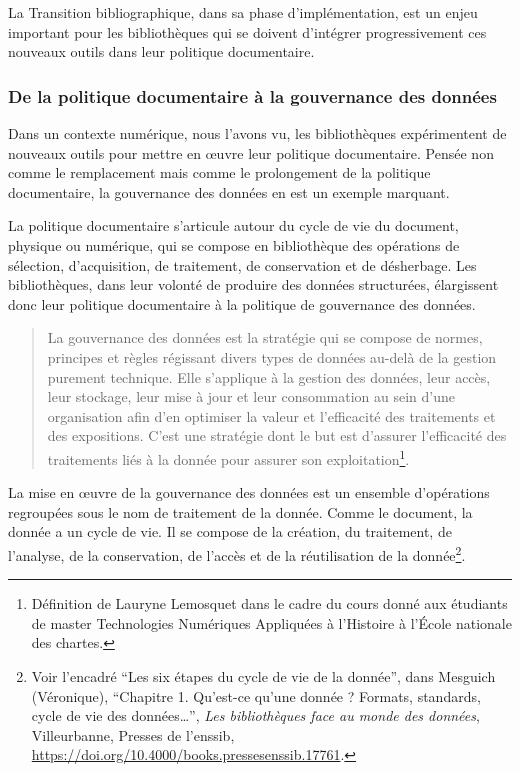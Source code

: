 La Transition bibliographique, dans sa phase d’implémentation, est un enjeu important pour les bibliothèques qui se doivent d’intégrer progressivement ces nouveaux outils dans leur politique documentaire.

\subsubsection*{De la politique documentaire à la gouvernance des données}

Dans un contexte numérique, nous l'avons vu, les bibliothèques expérimentent de nouveaux outils pour mettre en œuvre leur politique documentaire. Pensée non comme le remplacement mais comme le prolongement de la politique documentaire, la gouvernance des données en est un exemple marquant.

La politique documentaire s'articule autour du cycle de vie du document, physique ou numérique, qui se compose en bibliothèque des opérations de sélection, d'acquisition, de traitement, de conservation et de désherbage. Les bibliothèques, dans leur volonté de produire des données structurées, élargissent donc leur politique documentaire à la politique de gouvernance des données.

\begin{quotation}
	La gouvernance des données est la stratégie qui se compose de normes, principes et règles régissant divers types de données au-delà de la gestion purement technique. Elle s'applique à la gestion des données, leur accès, leur stockage, leur mise à jour et leur consommation au sein d’une organisation afin d’en optimiser la valeur et l’efficacité des traitements et des expositions. C'est une stratégie dont le but est d’assurer l’efficacité des traitements liés à la donnée pour assurer son exploitation\footnote{Définition de Lauryne Lemosquet dans le cadre du cours donné aux étudiants de master Technologies Numériques Appliquées à l'Histoire à l'École nationale des chartes.}.
\end{quotation}

La mise en œuvre de la gouvernance des données est un ensemble d'opérations regroupées sous le nom de traitement de la donnée. Comme le document, la donnée a un cycle de vie. Il se compose de la création, du traitement, de l'analyse, de la conservation, de l'accès et de la réutilisation de la donnée\footnote{Voir l'encadré \enquote{Les six étapes du cycle de vie de la donnée}, dans Mesguich (Véronique), \enquote{Chapitre 1. Qu’est-ce qu’une donnée ? Formats, standards, cycle de vie des données…}, \textit{Les bibliothèques face au monde des données}, Villeurbanne, Presses de l’enssib, \url{https://doi.org/10.4000/books.pressesenssib.17761}.}.

